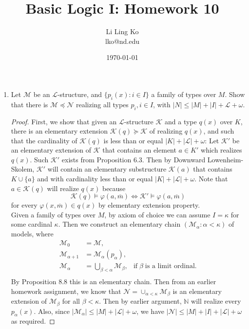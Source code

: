 \documentclass{article}
\begin{document}
\title{Basic Logic I: Homework 10}
\author{Li Ling Ko\\ lko@nd.edu}
\date{\today}
\maketitle

\begin{enumerate}[label={\bf Q\arabic*:}]
  \item Let $\mathcal{M}$ be an $\mathcal{L}$-structure, and $\{p_i(x):i\in
    I\}$ a family of types over $M$. Show that there is
    $\mathcal{M}\preceq\mathcal{N}$ realizing all types $p_i,i\in I$, with
    $|N|\leq|M|+|I|+\mathcal{L}+\omega$.

    \begin{proof}
      First, we show that given an $\mathcal{L}$-structure $\mathcal{K}$
      and a type $q(x)$ over $K$, there is an elementary extension
      $\mathcal{K}(q)\succeq\mathcal{K}$ of realizing $q(x)$, and such that
      the cardinality of $\mathcal{K}(q)$ is less than or equal
      $|K|+|\mathcal{L}|+\omega$: Let $\mathcal{K}'$ be an elementary
      extension of $\mathcal{K}$ that contains an element $a\in K'$ which
      realizes $q(x)$. Such $\mathcal{K}'$ exists from Proposition 6.3.
      Then by Downward Lowenheim-Skolem, $\mathcal{K}'$ will contain an
      elementary substructure $\mathcal{K}(a)$ that contains $K\cup\{a\}$
      and with cardinality less than or equal $|K|+|\mathcal{L}|+\omega$.
      Note that $a\in\mathcal{K}(q)$ will realize $q(x)$ because
      \[\mathcal{K}(q)\models\varphi(a,\overline{m}) \Leftrightarrow
      \mathcal{K}'\models\varphi(a,\overline{m})\] for every
      $\varphi(x,\overline{m})\in q(x)$ by elementary extension property. \\

      Given a family of types over $M$, by axiom of choice we
      can assume $I=\kappa$ for some cardinal $\kappa$. Then we construct
      an elementary chain $(\mathcal{M}_\alpha:\alpha<\kappa)$ of models,
      where
      \begin{align*}
        \mathcal{M}_0 &=\mathcal{M}, \\
        \mathcal{M}_{\alpha+1} &=\mathcal{M}_{\alpha}(p_\alpha), \\
        \mathcal{M}_{\alpha} &=\bigcup_{\beta<\alpha}\mathcal{M}_{\beta},
          &\text{if}\; \beta\; \text{is a limit ordinal}. \\
      \end{align*}
      By Proposition 8.8 this is an elementary chain. Then from an earlier
      homework assignment, we know that
      $\mathcal{N}=\cup_{\alpha<\kappa}\mathcal{M}_\beta$ is an elementary
      extension of $\mathcal{M}_\beta$ for all $\beta<\kappa$. Then by
      earlier argument, $\mathbb{N}$ will realize every $p_\alpha(x)$.
      Also, since $|\mathcal{M}_\alpha|\leq|M|+|\mathcal{L}|+\omega$, we
      have $|\mathcal{N}|\leq|M|+|I|+|\mathcal{L}|+\omega$ as required.
    \end{proof}


\end{enumerate}
\end{document}
